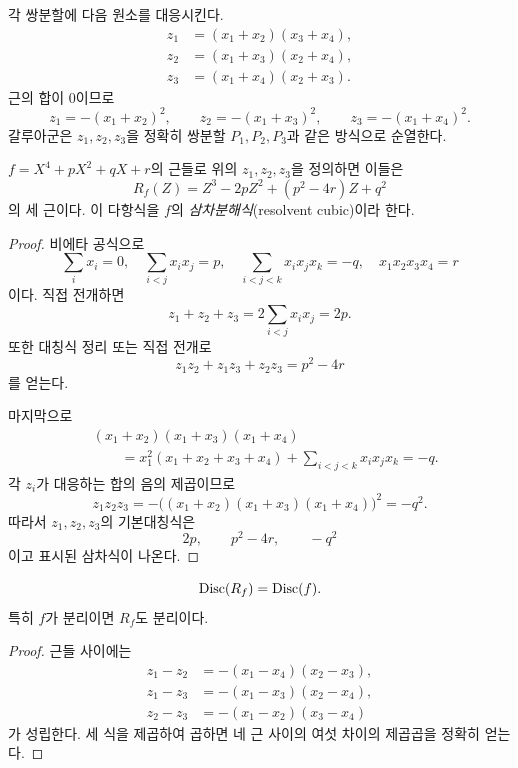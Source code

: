 각 쌍분할에 다음 원소를 대응시킨다.
\[
\begin{aligned}
  z_1&=(x_1+x_2)(x_3+x_4),\\
  z_2&=(x_1+x_3)(x_2+x_4),\\
  z_3&=(x_1+x_4)(x_2+x_3).
\end{aligned}
\]
근의 합이 $0$이므로
\[
  z_1=-(x_1+x_2)^2,
  \qquad
  z_2=-(x_1+x_3)^2,
  \qquad
  z_3=-(x_1+x_4)^2.
\]
갈루아군은 $z_1,z_2,z_3$을 정확히 쌍분할 $P_1,P_2,P_3$과 같은 방식으로 순열한다.

\begin{theorem}
\label{thm:quartic-resolvent-cubic}
$f=X^4+pX^2+qX+r$의 근들로 위의 $z_1,z_2,z_3$을 정의하면 이들은
\[
  \boxed{
  R_f(Z)=Z^3-2pZ^2+(p^2-4r)Z+q^2
  }
\]
의 세 근이다. 이 다항식을 $f$의 \emph{삼차분해식}(resolvent cubic)이라 한다.
\end{theorem}

\begin{proof}
비에타 공식으로
\[
  \sum_i x_i=0,
  \quad
  \sum_{i<j}x_ix_j=p,
  \quad
  \sum_{i<j<k}x_ix_jx_k=-q,
  \quad
  x_1x_2x_3x_4=r
\]
이다. 직접 전개하면
\[
  z_1+z_2+z_3=2\sum_{i<j}x_ix_j=2p.
\]
또한 대칭식 정리 또는 직접 전개로
\[
  z_1z_2+z_1z_3+z_2z_3=p^2-4r
\]
를 얻는다.

마지막으로
\[
\begin{aligned}
 &(x_1+x_2)(x_1+x_3)(x_1+x_4)\\
 &\qquad=x_1^2(x_1+x_2+x_3+x_4)
 +\sum_{i<j<k}x_ix_jx_k=-q.
\end{aligned}
\]
각 $z_i$가 대응하는 합의 음의 제곱이므로
\[
  z_1z_2z_3
  =-\bigl((x_1+x_2)(x_1+x_3)(x_1+x_4)\bigr)^2
  =-q^2.
\]
따라서 $z_1,z_2,z_3$의 기본대칭식은
\[
  2p,\qquad p^2-4r,\qquad -q^2
\]
이고 표시된 삼차식이 나온다.
\end{proof}

\begin{proposition}[두 판별식의 일치]
\label{prop:quartic-resolvent-discriminant}
\[
  \operatorname{Disc}(R_f)=\operatorname{Disc}(f).
\]
특히 $f$가 분리이면 $R_f$도 분리이다.
\end{proposition}

\begin{proof}
근들 사이에는
\[
\begin{aligned}
  z_1-z_2&=-(x_1-x_4)(x_2-x_3),\\
  z_1-z_3&=-(x_1-x_3)(x_2-x_4),\\
  z_2-z_3&=-(x_1-x_2)(x_3-x_4)
\end{aligned}
\]
가 성립한다. 세 식을 제곱하여 곱하면 네 근 사이의 여섯 차이의 제곱곱을 정확히 얻는다.
\end{proof}

